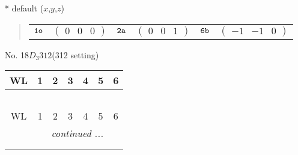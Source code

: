 \documentclass[fleqn,9pt,landscape]{jsarticle}
\begin{document}
* default ($x$,$y$,$z$)
\begin{quote}
\begin{tabular}{cccccc}
$ {\tt 1o} $ & $ \begin{pmatrix} 0 & 0 & 0 \end{pmatrix} $ & $ {\tt 2a} $ & $ \begin{pmatrix} 0 & 0 & 1 \end{pmatrix} $ & $ {\tt 6b} $ & $ \begin{pmatrix} -1 & -1 & 0 \end{pmatrix} $
\end{tabular}
\end{quote}
\newpage
No. 18\quad$D_{3}$\quad$312$\quad(312 setting)\quad[ trigonal ]
\begin{center}
\renewcommand{\arraystretch}{1.2}
\begin{longtable}{ccccccc}
 \hline \hline
WL & 1 & 2 & 3 & 4 & 5 & 6 \\ \hline \endfirsthead

\multicolumn{6}{l}{\tablename\ \thetable{}} \\
 \hline \hline
WL & 1 & 2 & 3 & 4 & 5 & 6 \\ \hline \endhead

 \hline \hline
\multicolumn{6}{r}{\footnotesize\it continued ...} \\ \endfoot

 \hline \hline
\multicolumn{6}{r}{} \\ \endlastfoot


\end{longtable}
\end{center}
\end{document}
